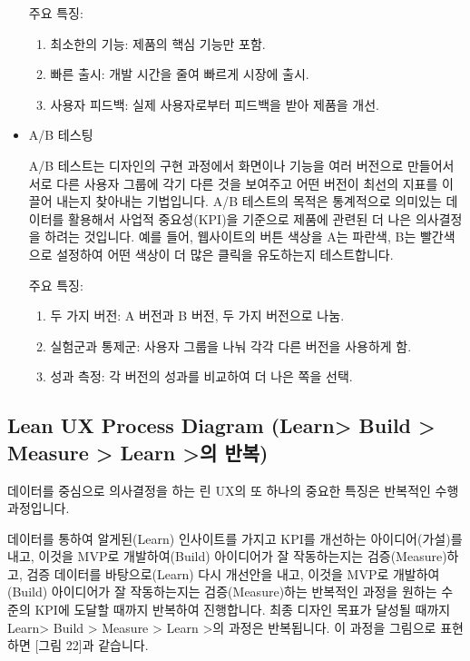 \documentclass[
  letterpaper,
]{book}
\providecommand{\tightlist}{%
  \setlength{\itemsep}{0pt}\setlength{\parskip}{0pt}}\usepackage{longtable,booktabs,array}
\begin{document}
\begin{itemize}
  주요 특징:

  \begin{enumerate}
  \def\labelenumi{\arabic{enumi}.}
  \tightlist
  \item
    최소한의 기능: 제품의 핵심 기능만 포함.
  \item
    빠른 출시: 개발 시간을 줄여 빠르게 시장에 출시.
  \item
    사용자 피드백: 실제 사용자로부터 피드백을 받아 제품을 개선.
  \end{enumerate}
\item
  A/B 테스팅

  A/B 테스트는 디자인의 구현 과정에서 화면이나 기능을 여러 버전으로
  만들어서 서로 다른 사용자 그룹에 각기 다른 것을 보여주고 어떤 버전이
  최선의 지표를 이끌어 내는지 찾아내는 기법입니다. A/B 테스트의 목적은
  통계적으로 의미있는 데이터를 활용해서 사업적 중요성(KPI)을 기준으로
  제품에 관련된 더 나은 의사결정을 하려는 것입니다. 예를 들어,
  웹사이트의 버튼 색상을 A는 파란색, B는 빨간색으로 설정하여 어떤 색상이
  더 많은 클릭을 유도하는지 테스트합니다.

  주요 특징:

  \begin{enumerate}
  \def\labelenumi{\arabic{enumi}.}
  \tightlist
  \item
    두 가지 버전: A 버전과 B 버전, 두 가지 버전으로 나눔.
  \item
    실험군과 통제군: 사용자 그룹을 나눠 각각 다른 버전을 사용하게 함.
  \item
    성과 측정: 각 버전의 성과를 비교하여 더 나은 쪽을 선택.
  \end{enumerate}
\end{itemize}

\subsection{Lean UX Process Diagram (Learn\textgreater{} Build
\textgreater{} Measure \textgreater{} Learn \textgreater 의
반복)}\label{lean-ux-process-diagram-learn-build-measure-learn-uxc758-uxbc18uxbcf5}

데이터를 중심으로 의사결정을 하는 린 UX의 또 하나의 중요한 특징은
반복적인 수행 과정입니다.

데이터를 통하여 알게된(Learn) 인사이트를 가지고 KPI를 개선하는
아이디어(가설)를 내고, 이것을 MVP로 개발하여(Build) 아이디어가 잘
작동하는지는 검증(Measure)하고, 검증 데이터를 바탕으로(Learn) 다시
개선안을 내고, 이것을 MVP로 개발하여(Build) 아이디어가 잘 작동하는지는
검증(Measure)하는 반복적인 과정을 원하는 수준의 KPI에 도달할 때까지
반복하여 진행합니다. 최종 디자인 목표가 달성될 때까지
Learn\textgreater{} Build \textgreater{} Measure \textgreater{} Learn
\textgreater 의 과정은 반복됩니다. 이 과정을 그림으로 표현하면 {[}그림
22{]}과 같습니다.
\end{document}
